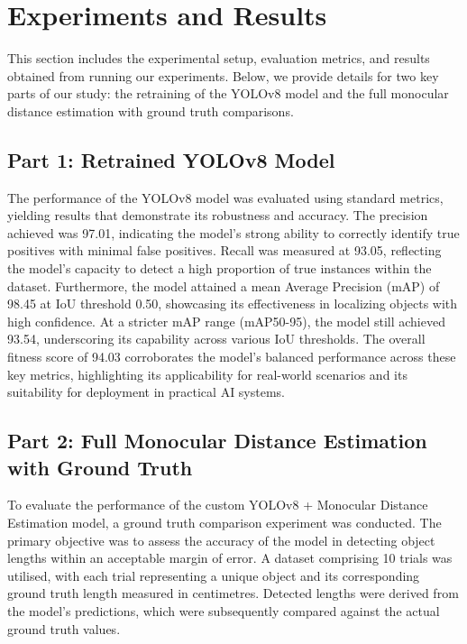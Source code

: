 \section{Experiments and Results}

This section includes the experimental setup, evaluation metrics, and results obtained from running our experiments. Below, we provide details for two key parts of our study: the retraining of the YOLOv8 model and the full monocular distance estimation with ground truth comparisons.

\subsection{Part 1: Retrained YOLOv8 Model}

The performance of the YOLOv8 model was evaluated using standard metrics, yielding results that demonstrate its robustness and accuracy. The precision achieved was 97.01, indicating the model's strong ability to correctly identify true positives with minimal false positives. Recall was measured at 93.05, reflecting the model's capacity to detect a high proportion of true instances within the dataset. Furthermore, the model attained a mean Average Precision (mAP) of 98.45 at IoU threshold 0.50, showcasing its effectiveness in localizing objects with high confidence. At a stricter mAP range (mAP50-95), the model still achieved 93.54, underscoring its capability across various IoU thresholds. The overall fitness score of 94.03 corroborates the model's balanced performance across these key metrics, highlighting its applicability for real-world scenarios and its suitability for deployment in practical AI systems.

\subsection{Part 2: Full Monocular Distance Estimation with Ground Truth}

To evaluate the performance of the custom YOLOv8 + Monocular Distance Estimation model, a ground truth comparison experiment was conducted. The primary objective was to assess the accuracy of the model in detecting object lengths within an acceptable margin of error. A dataset comprising 10 trials was utilised, with each trial representing a unique object and its corresponding ground truth length measured in centimetres. Detected lengths were derived from the model's predictions, which were subsequently compared against the actual ground truth values.

